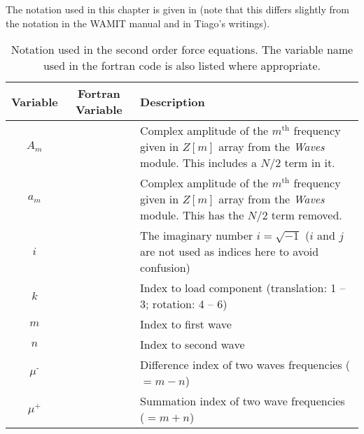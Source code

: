 The notation used in this chapter is given in  (note that this differs slightly from the notation in the WAMIT manual\cite{WAMIT} and in Tiago's writings\cite{duarte:2014}).
\begin{table}[h!]
   \centering
   \caption{Notation used in the second order force equations.  
            The variable name used in the fortran code is also listed where appropriate.
            \label{tab:2ndOrdNotation}}
   \begin{tabular}{ccl}
      \toprule
         Variable          & Fortran Variable      &  Description                                                       \\
      \midrule
      $A_m$                &                       &  \parbox[t]{3.5in}{Complex amplitude of the $m^\text{th}$ frequency
                                                               given in $Z[m]$ array from the \emph{Waves} module.  This 
                                                               includes a $N/2$ term in it.}                            \\[13pt]
      $a_m$                &                       &  \parbox[t]{3.5in}{Complex amplitude of the $m^\text{th}$ frequency
                                                               given in $Z[m]$ array from the \emph{Waves} module.  This 
                                                               has the $N/2$ term removed.}                             \\[13pt]
      $i$                  &     &  \parbox[t]{3.5in}{The imaginary number $i = \sqrt{-1}$ ($i$ and
                                                               $j$ are not used as indices here to avoid confusion)}    \\[13pt]
      $k$                  &                       &  Index to load component (translation: 1 -- 3; rotation: 4 -- 6)   \\
      $m$                  &                       &  Index to first wave                                               \\
      $n$                  &                       &  Index to second wave                                              \\
      $\mu^\text{-}$       &                       &  Difference index of two waves frequencies ($= m-n$)               \\
      $\mu^{+}$            &                       &  Summation  index of two wave frequencies ($= m+n$)                \\

\end{tabular}
\end{table}
